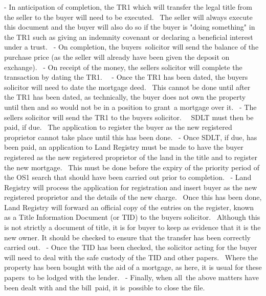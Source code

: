 \documentclass[
]{article}
\newenvironment{Shaded}{}{}
\newcommand{\NormalTok}[1]{#1}
\begin{document}
\begin{Shaded}
\begin{Highlighting}[]
\NormalTok{{-}   In anticipation of completion, the TR1 which will transfer the legal title from the seller to the buyer will need to be executed.  The seller will always execute this document and the buyer will also do so if the buyer is "doing something" in the TR1 such as giving an indemnity covenant or declaring a beneficial interest under a trust. }
\NormalTok{{-}   On completion, the buyer\textquotesingle{}s solicitor will send the balance of the purchase price (as the seller will already have been given the deposit on exchange). }
\NormalTok{{-}   On receipt of the money, the seller\textquotesingle{}s solicitor will complete the transaction by dating the TR1.  }
\NormalTok{{-}   Once the TR1 has been dated, the buyer\textquotesingle{}s solicitor will need to date the mortgage deed.  This cannot be done until after the TR1 has been dated, as technically, the buyer does not own the property until then and so would not be in a position to grant a mortgage over it. }
\NormalTok{{-}   The seller\textquotesingle{}s solicitor will send the TR1 to the buyer\textquotesingle{}s solicitor.   SDLT must then be paid, if due.  The application to register the buyer as the new registered proprietor cannot take place until this has been done. }
\NormalTok{{-}   Once SDLT, if due, has been paid, an application to Land Registry must be made to have the buyer registered as the new registered proprietor of the land in the title and to register the new mortgage.  This must be done before the expiry of the priority period of the OS1 search that should have been carried out prior to completion. }
\NormalTok{{-}   Land Registry will process the application for registration and insert buyer as the new registered proprietor and the details of the new charge.  Once this has been done, Land Registry will forward an official copy of the entries on the register, known as a Title Information Document (or TID) to the buyer\textquotesingle{}s solicitor.  Although this is not strictly a document of title, it is for buyer to keep as evidence that it is the new owner. It should be checked to ensure that the transfer has been correctly carried out. }
\NormalTok{{-}   Once the TID has been checked, the solicitor acting for the buyer will need to deal with the safe custody of the TID and other papers.  Where the property has been bought with the aid of a mortgage, as here, it is usual for these papers to be lodged with the lender. }
\NormalTok{{-}   Finally, when all the above matters have been dealt with and the bill paid, it is possible to close the file.}
\end{Highlighting}
\end{Shaded}
\end{document}
